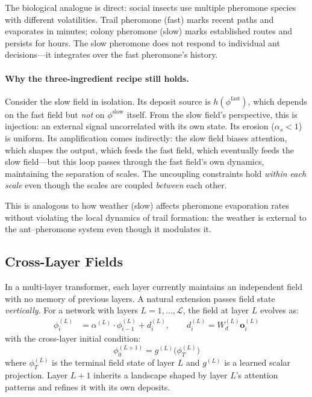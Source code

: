 \documentclass[11pt,a4paper]{article}
\newcommand{\retain}{\alpha}
\begin{document}
The biological analogue is direct: social insects use multiple
pheromone species with different volatilities.  Trail pheromone
(fast) marks recent paths and evaporates in minutes; colony
pheromone (slow) marks established routes and persists for hours.
The slow pheromone does not respond to individual ant decisions---it
integrates over the fast pheromone's history.

\paragraph{Why the three-ingredient recipe still holds.}
Consider the slow field in isolation.  Its deposit source is
$h(\phi^{\text{fast}})$, which depends on the fast field but
\emph{not} on $\phi^{\text{slow}}$ itself.  From the slow field's
perspective, this is injection: an external signal uncorrelated with
its own state.  Its erosion ($\retain_s < 1$) is uniform.  Its
amplification comes indirectly: the slow field biases attention,
which shapes the output, which feeds the fast field, which eventually
feeds the slow field---but this loop passes through the fast field's
own dynamics, maintaining the separation of scales.  The
uncoupling constraints hold \emph{within each scale} even though the
scales are coupled \emph{between} each other.

This is analogous to how weather (slow) affects pheromone evaporation
rates without violating the local dynamics of trail formation: the
weather is external to the ant--pheromone system even though it
modulates it.

\subsection{Cross-Layer Fields}
\label{sec:crosslayer}

In a multi-layer transformer, each layer currently maintains an
independent field with no memory of previous layers.  A natural
extension passes field state \emph{vertically}.  For a network with
layers $L = 1, \ldots, \mathcal{L}$, the field at layer $L$ evolves
as:
\begin{align}
    \phi_i^{(L)} &= \retain^{(L)} \cdot \phi_{i-1}^{(L)} + d_i^{(L)},
    \qquad d_i^{(L)} = W_d^{(L)} \bm{o}_i^{(L)}
    \label{eq:crosslayer_recurrence}
\end{align}
with the cross-layer initial condition:
\begin{equation}
    \phi_0^{(L+1)} = g^{(L)}\!\bigl(\phi_T^{(L)}\bigr)
    \label{eq:crosslayer_init}
\end{equation}
where $\phi_T^{(L)}$ is the terminal field state of layer $L$ and
$g^{(L)}$ is a learned scalar projection.  Layer $L+1$ inherits a
landscape shaped by layer $L$'s attention patterns and refines it
with its own deposits.
\end{document}
